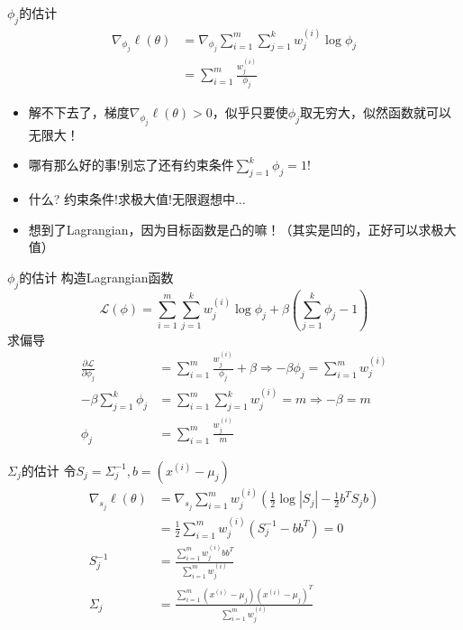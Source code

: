 \documentclass[noindent]{beamer}
\begin{document}
\begin{frame}{$\phi_j$的估计}
\begin{equation}
    \begin{split}
        \nabla _{ \phi _j} \ell(\theta) &= \nabla _{ \phi _j} \sum_{i=1}^m  \sum_{j=1}^k w_j^{(i)} \log \phi _j \\
                                    &= \sum_{i=1}^m \frac{w_j^{(i)}}{\phi_j}
    \end{split}
\end{equation}
\begin{itemize}
\item 解不下去了，梯度$\nabla _{ \phi _j} \ell(\theta)  > 0$，似乎只要使$\phi_j$取无穷大，似然函数就可以无限大！
\pause
\item 哪有那么好的事!别忘了还有约束条件$\sum_{j=1}^k \phi_j = 1$! 
\pause
\item 什么? \alert{约束条件}!求\alert{极大值}!无限遐想中$\ldots$\\
\pause
\item 想到了Lagrangian，因为目标函数是凸的嘛！\pause（其实是凹的，正好可以求极大值）
\end{itemize}
\end{frame}

\begin{frame}{$\phi_j$的估计}
构造Lagrangian函数
\begin{equation}
\mathcal{L}(\phi) = \sum_{i=1}^m \sum_{j=1}^k w_j^{(i)} \log \phi_j +\beta(\sum_{j=1}^k \phi_j - 1) 
\end{equation}
求偏导
\begin{equation}
    \begin{split} 
        \frac{\partial \mathcal{L}}{\partial \phi_j} &=  \sum_{i=1}^m \frac{w_j^{(i)}} {\phi_j} + \beta  \Rightarrow 
      -\beta \phi_j = \sum_{i=1}^m w_j^{(i)} \\
      -\beta \sum_{j=1}^k \phi_j &= \sum_{i=1}^m \sum_{j=1}^k w_j^{(i)} = m \Rightarrow -\beta = m \\
    \phi_j &= \sum_{i=1}^m \frac{w_j^{(i)}}{m}
    \end{split}
\end{equation}
\end{frame}

\begin{frame} {$\Sigma_j$的估计}
令$S_j = \Sigma_j^{-1}, b = (x^{(i)}-\mu_j)$ \\
\begin{equation}
    \begin{split}
    \nabla_{s_j} \ell(\theta) &= \nabla_{s_j} \sum_{i=1}^m w_j^{(i)}(\frac{1}{2}\log|S_j|-\frac{1}{2}b^T S_j b) \\
                          &= \frac{1}{2}\sum_{i=1}^m w_j^{(i)}(S_j^{-1}-bb^T) = 0\\
                 S_j^{-1} &= \frac{\sum_{i=1}^m w_j^{(i)} bb^T}{\sum_{i=1}^m w_j^{(i)}} \\
                 \Sigma_j &= \frac{\sum_{i=1}^m (x^{(i)}-\mu_j)(x^{(i)}-\mu_j)^T}{\sum_{i=1}^m w_j^{(i)}}
    \end{split}
\end{equation}

\end{frame}
\end{document}
